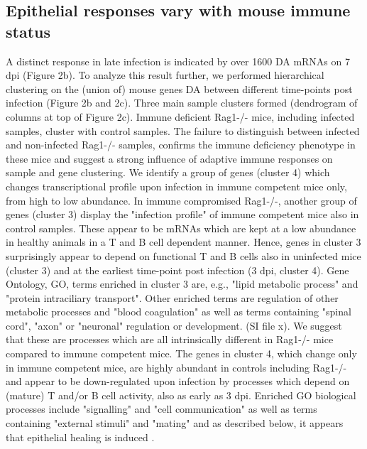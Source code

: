 \documentclass{bmcart}
\begin{document}
\subsection*{Epithelial responses vary with mouse immune status}
A distinct response in late infection is indicated by over 1600 DA mRNAs on 7 dpi (Figure 2b). To analyze this result further, we performed hierarchical clustering on the (union of) mouse genes DA between different time-points post infection (Figure 2b and 2c). Three main sample clusters formed (dendrogram of columns at top of Figure 2c). Immune deficient Rag1-/- mice, including infected samples, cluster with control samples. The failure to distinguish between infected and non-infected Rag1-/- samples, confirms the immune deficiency phenotype in these mice and suggest a strong influence of adaptive immune responses on sample and gene clustering. 
We identify a group of genes (cluster 4) which changes transcriptional profile upon infection in immune competent mice only, from high to low abundance. In immune compromised Rag1-/-, another group of genes (cluster 3) display the "infection profile" of immune competent mice also in control samples. These appear to be mRNAs which are kept at a low abundance in healthy animals in a T and B cell dependent manner. Hence, genes in cluster 3 surprisingly appear to depend on functional T and B cells also in uninfected mice (cluster 3) and at the earliest time-point post infection (3 dpi, cluster 4). 
Gene Ontology, GO, terms enriched in cluster 3 are, e.g., "lipid metabolic process" and "protein intraciliary transport". Other enriched terms are regulation of other metabolic processes and "blood coagulation" as well as terms containing "spinal cord", "axon" or "neuronal" regulation or development. (SI file x). We suggest that these are processes which are all intrinsically different in Rag1-/- mice compared to immune competent mice. The genes in cluster 4, which change only in immune competent mice, are highly abundant in controls including Rag1-/- and appear to be down-regulated upon infection by processes which depend on (mature) T and/or B cell activity, also as early as 3 dpi. Enriched GO biological processes include "signalling" and "cell communication" as well as terms containing "external stimuli" and "mating" and as described below, it appears that epithelial healing is induced . 
\end{document}
